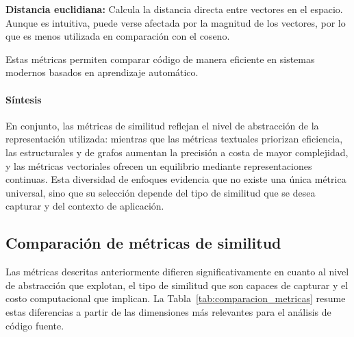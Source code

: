 \textbf{Distancia euclidiana:} Calcula la distancia directa entre vectores en el espacio. Aunque es intuitiva, puede verse afectada por la magnitud de los vectores, por lo que es menos utilizada en comparación con el coseno.

Estas métricas permiten comparar código de manera eficiente en sistemas modernos basados en aprendizaje automático.

\paragraph{Síntesis}

En conjunto, las métricas de similitud reflejan el nivel de abstracción de la representación utilizada: mientras que las métricas textuales priorizan eficiencia, las estructurales y de grafos aumentan la precisión a costa de mayor complejidad, y las métricas vectoriales ofrecen un equilibrio mediante representaciones continuas. Esta diversidad de enfoques evidencia que no existe una única métrica universal, sino que su selección depende del tipo de similitud que se desea capturar y del contexto de aplicación.

\subsection{Comparación de métricas de similitud}

Las métricas descritas anteriormente difieren significativamente en cuanto al nivel 
de abstracción que explotan, el tipo de similitud que son capaces de capturar y el 
costo computacional que implican. La Tabla~\ref{tab:comparacion_metricas} resume 
estas diferencias a partir de las dimensiones más relevantes para el análisis de 
código fuente.

